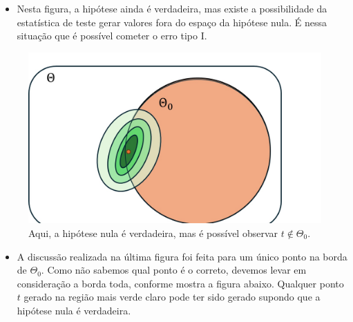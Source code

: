 \documentclass[
  letterpaper,
  DIV=11,
  numbers=noendperiod]{scrartcl}
\providecommand{\tightlist}{%
  \setlength{\itemsep}{0pt}\setlength{\parskip}{0pt}}\usepackage{longtable,booktabs,array}
\begin{document}
\begin{itemize}
\tightlist
\item
  Nesta figura, a hipótese ainda é verdadeira, mas existe a
  possibilidade da estatística de teste gerar valores fora do espaço da
  hipótese nula. É nessa situação que é possível cometer o erro tipo I.
\end{itemize}

\begin{figure}

{\centering \includegraphics{fig_testc.jpg}

}

\caption{Aqui, a hipótese nula é verdadeira, mas é possível observar
\(t\notin\Theta_0\).}

\end{figure}%

\begin{itemize}
\tightlist
\item
  A discussão realizada na última figura foi feita para um único ponto
  na borda de \(\Theta_0\). Como não sabemos qual ponto é o correto,
  devemos levar em consideração a borda toda, conforme mostra a figura
  abaixo. Qualquer ponto \(t\) gerado na região mais verde claro pode
  ter sido gerado supondo que a hipótese nula é verdadeira.
\end{itemize}
\end{document}
